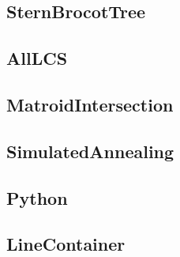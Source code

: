 \subsection{SternBrocotTree}

\subsection{AllLCS}

\subsection{MatroidIntersection}

\subsection{SimulatedAnnealing}

\subsection{Python}

\subsection{LineContainer}

